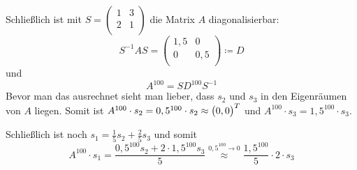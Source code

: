 \documentclass{scrreprt}
\begin{document}
\begin{itemize}
  Schließlich ist mit $S = \begin{pmatrix}
    1 & 3 \\
    2 & 1 \\
  \end{pmatrix}$ die Matrix $A$ diagonalisierbar:
  \[
    S^{-1}AS = \begin{pmatrix}
      1,5 & 0   \\
      0   & 0,5 \\
    \end{pmatrix} \coloneq D
  \]
  und
  \[
    A^{100} = SD^{100}S^{-1}
  \]
  Bevor man das ausrechnet sieht man lieber, dass $s_2$ und $s_3$ in den
  Eigenräumen von $A$ liegen.
  Somit ist $A^{100} \cdot s_2 = 0,5^{100} \cdot s_2 \approx \qty\big(0, 0)^T$
  und $A^{100} \cdot s_3 = 1,5^{100} \cdot s_3$.

  Schließlich ist noch $s_1 = \frac{1}{5}s_2 + \frac{2}{5}s_3$ und somit
  \[
    A^{100} \cdot s_1 = \frac{0,5^{100}s_2 + 2 \cdot 1,5^{100}s_3}{5}
    \overset{0,5^{100} \longrightarrow 0}\approx \frac{1,5^{100}}{5} \cdot 2 \cdot s_3
  \]


\end{itemize}
\end{document}
